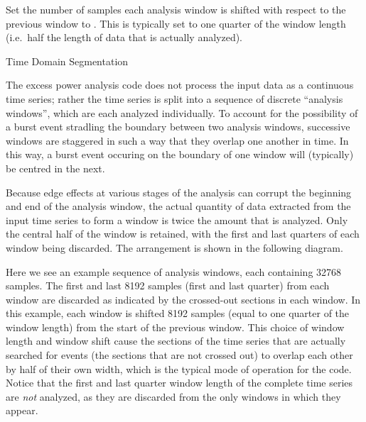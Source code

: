 \begin{entry}
\begin{entry}
\item[\option{--window-shift} \parm{samples}]
Set the number of samples each analysis window is shifted with respect to
the previous window to .  This is typically set to one
quarter of the window length (i.e.\ half the length of data that is
actually analyzed).

\end{entry}

\item[Time Domain Segmentation]\leavevmode

The excess power analysis code does not process the input data as a
continuous time series;  rather the time series is split into a sequence of
discrete ``analysis windows'', which are each analyzed individually.  To
account for the possibility of a burst event stradling the boundary between
two analysis windows, successive windows are staggered in such a way that
they overlap one another in time.  In this way, a burst event occuring on
the boundary of one window will (typically) be centred in the next.

Because edge effects at various stages of the analysis can corrupt the
beginning and end of the analysis window, the actual quantity of data
extracted from the input time series to form a window is twice the amount
that is analyzed.  Only the central half of the window is retained, with
the first and last quarters of each window being discarded.  The
arrangement is shown in the following diagram.
\begin{center}

\end{center}
Here we see an example sequence of analysis windows, each containing 32768
samples.  The first and last 8192 samples (first and last quarter) from
each window are discarded as indicated by the crossed-out sections in each
window.  In this example, each window is shifted 8192 samples (equal to one
quarter of the window length) from the start of the previous window.  This
choice of window length and window shift cause the sections of the time
series that are actually searched for events (the sections that are not
crossed out) to overlap each other by half of their own width, which is the
typical mode of operation for the code.  Notice that the first and last
quarter window length of the complete time series are \emph{not} analyzed,
as they are discarded from the only windows in which they appear.



\end{entry}
